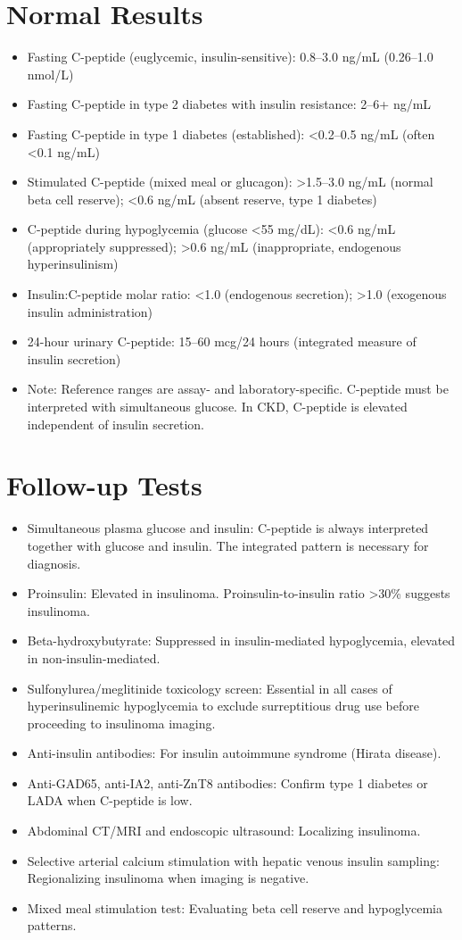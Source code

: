 \section*{Normal Results}
\begin{itemize}
  \item Fasting C-peptide (euglycemic, insulin-sensitive): 0.8--3.0 ng/mL (0.26--1.0 nmol/L)
  \item Fasting C-peptide in type 2 diabetes with insulin resistance: 2--6+ ng/mL
  \item Fasting C-peptide in type 1 diabetes (established): <0.2--0.5 ng/mL (often <0.1 ng/mL)
  \item Stimulated C-peptide (mixed meal or glucagon): >1.5--3.0 ng/mL (normal beta cell reserve); <0.6 ng/mL (absent reserve, type 1 diabetes)
  \item C-peptide during hypoglycemia (glucose <55 mg/dL): <0.6 ng/mL (appropriately suppressed); >0.6 ng/mL (inappropriate, endogenous hyperinsulinism)
  \item Insulin:C-peptide molar ratio: <1.0 (endogenous secretion); >1.0 (exogenous insulin administration)
  \item 24-hour urinary C-peptide: 15--60 mcg/24 hours (integrated measure of insulin secretion)
  \item Note: Reference ranges are assay- and laboratory-specific. C-peptide must be interpreted with simultaneous glucose. In CKD, C-peptide is elevated independent of insulin secretion.
\end{itemize}

\section*{Follow-up Tests}
\begin{itemize}
  \item Simultaneous plasma glucose and insulin: C-peptide is always interpreted together with glucose and insulin. The integrated pattern is necessary for diagnosis.
  \item Proinsulin: Elevated in insulinoma. Proinsulin-to-insulin ratio >30\% suggests insulinoma.
  \item Beta-hydroxybutyrate: Suppressed in insulin-mediated hypoglycemia, elevated in non-insulin-mediated.
  \item Sulfonylurea/meglitinide toxicology screen: Essential in all cases of hyperinsulinemic hypoglycemia to exclude surreptitious drug use before proceeding to insulinoma imaging.
  \item Anti-insulin antibodies: For insulin autoimmune syndrome (Hirata disease).
  \item Anti-GAD65, anti-IA2, anti-ZnT8 antibodies: Confirm type 1 diabetes or LADA when C-peptide is low.
  \item Abdominal CT/MRI and endoscopic ultrasound: Localizing insulinoma.
  \item Selective arterial calcium stimulation with hepatic venous insulin sampling: Regionalizing insulinoma when imaging is negative.
  \item Mixed meal stimulation test: Evaluating beta cell reserve and hypoglycemia patterns.
\end{itemize}

